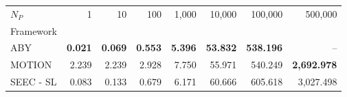 \begin{tabular}{lrrrrrrr}
\toprule
$N_P$ & 1 & 10 & 100 & 1,000 & 10,000 & 100,000 & 500,000 \\
Framework &  &  &  &  &  &  &  \\
\midrule
ABY~\cite{DSZ15} & \bfseries 0.021 & \bfseries 0.069 & \bfseries 0.553 & \bfseries 5.396 & \bfseries 53.832 & \bfseries 538.196 & -- \\
MOTION~\cite{BDST22} & 2.239 & 2.239 & 2.928 & 7.750 & 55.971 & 540.249 & \bfseries 2,692.978 \\
SEEC - SL & 0.083 & 0.133 & 0.679 & 6.171 & 60.666 & 605.618 & 3,027.498 \\
\bottomrule
\end{tabular}
